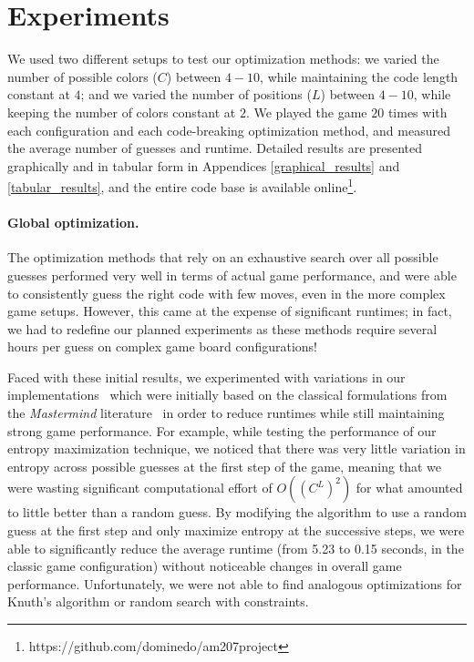 \documentclass[11pt]{article}
\begin{document}
\section{Experiments}

We used two different setups to test our optimization methods: we varied the number of possible colors ($C$) between $4-10$, while maintaining the code length constant at $4$; and we varied the number of positions ($L$) between $4-10$, while keeping the number of colors constant at $2$. We played the game $20$ times with each configuration and each code-breaking optimization method, and measured the average number of guesses and runtime. Detailed results are presented graphically and in tabular form in Appendices \ref{graphical_results} and \ref{tabular_results}, and the entire code base is available online\footnote{https://github.com/dominedo/am207project}.

\paragraph{Global optimization.} The optimization methods that rely on an exhaustive search over all possible guesses performed very well in terms of actual game performance, and were able to consistently guess the right code with few moves, even in the more complex game setups. However, this came at the expense of significant runtimes; in fact, we had to redefine our planned experiments as these methods require several hours per guess on complex game board configurations!

Faced with these initial results, we experimented with variations in our implementations \textendash \ which were initially based on the classical formulations from the \textit{Mastermind} literature \textendash \, in order to reduce runtimes while still maintaining strong game performance. For example, while testing the performance of our entropy maximization technique, we noticed that there was very little variation in entropy across possible guesses at the first step of the game, meaning that we were wasting significant computational effort of $O((C^L)^2)$ for what amounted to little better than a random guess. By modifying the algorithm to use a random guess at the first step and only maximize entropy at the successive steps, we were able to significantly reduce the average runtime (from 5.23 to 0.15 seconds, in the classic game configuration) without noticeable changes in overall game performance. Unfortunately, we were not able to find analogous optimizations for Knuth's algorithm or random search with constraints.
\end{document}
